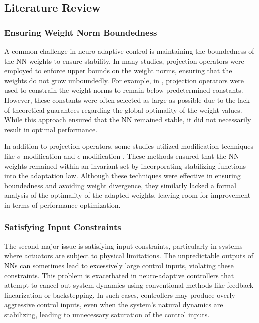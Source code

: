 \documentclass[lettersize,journal]{IEEEtran}
\begin{document}
\subsection{Literature Review}

\subsubsection{Ensuring Weight Norm Boundedness}

A common challenge in neuro-adaptive control is maintaining the boundedness of the NN weights to ensure stability. 
In many studies, projection operators were employed to enforce upper bounds on the weight norms, ensuring that the weights do not grow unboundedly. 
For example, in \cite{Zhou:2023aa,Griffis:2023aa,Patil:2022aa}, projection operators were used to constrain the weight norms to remain below predetermined constants. 
However, these constants were often selected as large as possible due to the lack of theoretical guarantees regarding the global optimality of the weight values. 
While this approach ensured that the NN remained stable, it did not necessarily result in optimal performance.

In addition to projection operators, some studies utilized modification techniques like $\sigma$-modification \cite{Ge:2002aa} and $\epsilon$-modification \cite{Esfandiari:2015aa,Gao:2006aa}. 
These methods ensured that the NN weights remained within an invariant set by incorporating stabilizing functions into the adaptation law. 
Although these techniques were effective in ensuring boundedness and avoiding weight divergence, they similarly lacked a formal analysis of the optimality of the adapted weights, leaving room for improvement in terms of performance optimization.

\subsubsection{Satisfying Input Constraints}

The second major issue is satisfying input constraints, particularly in systems where actuators are subject to physical limitations. 
The unpredictable outputs of NNs can sometimes lead to excessively large control inputs, violating these constraints. 
This problem is exacerbated in neuro-adaptive controllers that attempt to cancel out system dynamics using conventional methods like feedback linearization or backstepping. 
In such cases, controllers may produce overly aggressive control inputs, even when the system's natural dynamics are stabilizing, leading to unnecessary saturation of the control inputs.
\end{document}
